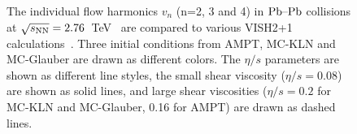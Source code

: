 \begin{figure}[h]
\begin{center}
        \caption{The individual flow harmonics $v_n$ (n=2, 3 and 4) in $\textnormal{Pb--Pb}$ collisions at $\sqrt{s_{\textnormal{NN}}}=2.76$~TeV~\cite{Adam:2016izf} are compared to various VISH2+1 calculations~\cite{Zhu:2016puf}. Three initial conditions from AMPT, MC-KLN and MC-Glauber are drawn as different colors. The $\eta/s$ parameters are shown as different line styles, the small shear viscosity ($\eta/s=0.08$) are shown as solid lines, and large shear viscosities ($\eta/s=0.2$ for MC-KLN and MC-Glauber, 0.16 for AMPT) are drawn as dashed lines.}
        \label{fig:Figure_9}
              \end{center}
\end{figure}

